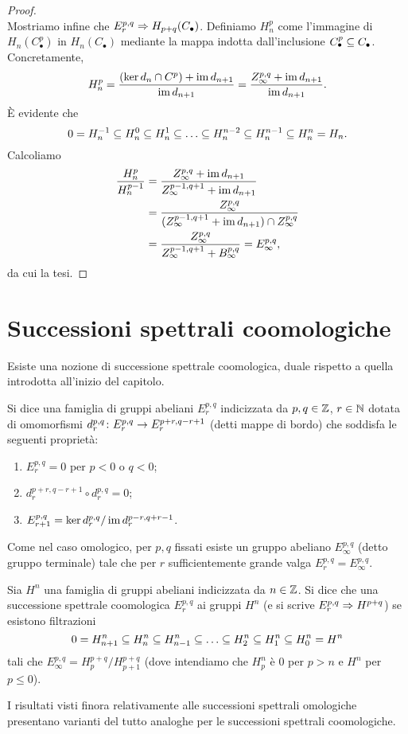 \begin{proof}
\[\]
Mostriamo infine che \(E^{p,q}_r\Rightarrow H_{p+q}(C_\bullet)\). Definiamo \(H^p_n\) come l'immagine di \(H_n(C^p_\bullet)\) in \(H_n(C_\bullet)\) mediante la mappa indotta dall'inclusione \(C^p_\bullet\subseteq C_\bullet\). Concretamente,
\[
H^p_n=\frac{(\ker d_n\cap C^p)+\operatorname{im} d_{n+1}}{\operatorname{im} d_{n+1}}=\frac{Z^{p,q}_\infty+\operatorname{im} d_{n+1}}{\operatorname{im} d_{n+1}}.
\]
È evidente che
\[
0=H^{-1}_n\subseteq H^0_n\subseteq H^1_n\subseteq\ldots\subseteq H^{n-2}_n\subseteq H^{n-1}_n\subseteq H^n_n=H_n.
\]
Calcoliamo
\begin{align*}
\frac{H^p_n}{H^{p-1}_n}&=\frac{Z^{p,q}_\infty+\operatorname{im} d_{n+1}}{Z^{p-1,q+1}_\infty+\operatorname{im} d_{n+1}}\\
&=\frac{Z^{p,q}_\infty}{(Z^{p-1,q+1}_\infty+\operatorname{im} d_{n+1})\cap Z^{p,q}_\infty}\\
&=\frac{Z^{p,q}_\infty}{Z^{p-1,q+1}_\infty+B^{p,q}_\infty}=E^{p,q}_\infty,
\end{align*}
da cui la tesi.
\end{proof}

\section{Successioni spettrali coomologiche}

Esiste una nozione di successione spettrale coomologica, duale rispetto a quella introdotta all'inizio del capitolo.

\begin{definition}
Si dice  una famiglia di gruppi abeliani \(E^{p,q}_r\) indicizzata da \(p,q\in\mathbb{Z}\), \(r\in\mathbb{N}\) dotata di omomorfismi \(\map{d^{p,q}_r}{E^{p,q}_r}{E^{p+r,q-r+1}_r}\) (detti mappe di bordo) che soddisfa le seguenti proprietà:
\begin{enumerate}
\item \(E^{p,q}_r=0\) per \(p<0\) o \(q<0\);
\item \(d^{p+r,q-r+1}_r\circ d^{p,q}_r=0\);
\item \(E^{p,q}_{r+1}=\ker d^{p,q}_r/\operatorname{im} d^{p-r,q+r-1}_r\).
\end{enumerate}
\end{definition}
Come nel caso omologico, per \(p,q\) fissati esiste un gruppo abeliano \(E^{p,q}_\infty\) (detto gruppo terminale) tale che per \(r\) sufficientemente grande valga \(E^{p,q}_r=E^{p,q}_\infty\).
\begin{definition}
Sia \(H^n\) una famiglia di gruppi abeliani indicizzata da \(n\in\mathbb{Z}\).
Si dice che una successione spettrale coomologica \(E^{p,q}_r\)  ai gruppi \(H^n\) (e si scrive \(E^{p,q}_r\Rightarrow H^{p+q}\)) se esistono filtrazioni
\[
0=H^n_{n+1}\subseteq H^n_n\subseteq H^n_{n-1}\subseteq\ldots\subseteq H^n_2\subseteq H^n_1\subseteq H^n_0=H^n
\]
tali che \(E^{p,q}_\infty=H^{p+q}_p/H^{p+q}_{p+1}\) (dove intendiamo che \(H_p^n\) è \(0\) per \(p>n\) e \(H^n\) per \(p\le 0\)).
\end{definition}
I risultati visti finora relativamente alle successioni spettrali omologiche presentano varianti del tutto analoghe per le successioni spettrali coomologiche.
